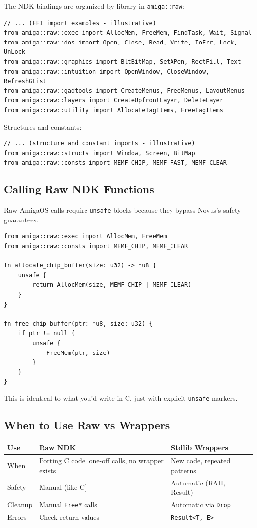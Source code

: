 The NDK bindings are organized by library in \texttt{amiga::raw}:

\begin{lstlisting}
// ... (FFI import examples - illustrative)
from amiga::raw::exec import AllocMem, FreeMem, FindTask, Wait, Signal
from amiga::raw::dos import Open, Close, Read, Write, IoErr, Lock, UnLock
from amiga::raw::graphics import BltBitMap, SetAPen, RectFill, Text
from amiga::raw::intuition import OpenWindow, CloseWindow, RefreshGList
from amiga::raw::gadtools import CreateMenus, FreeMenus, LayoutMenus
from amiga::raw::layers import CreateUpfrontLayer, DeleteLayer
from amiga::raw::utility import AllocateTagItems, FreeTagItems
\end{lstlisting}

Structures and constants:

\begin{lstlisting}
// ... (structure and constant imports - illustrative)
from amiga::raw::structs import Window, Screen, BitMap
from amiga::raw::consts import MEMF_CHIP, MEMF_FAST, MEMF_CLEAR
\end{lstlisting}

\subsection{Calling Raw NDK Functions}

Raw AmigaOS calls require \texttt{unsafe} blocks because they bypass Novus's safety guarantees:

\begin{lstlisting}
from amiga::raw::exec import AllocMem, FreeMem
from amiga::raw::consts import MEMF_CHIP, MEMF_CLEAR

fn allocate_chip_buffer(size: u32) -> *u8 {
    unsafe {
        return AllocMem(size, MEMF_CHIP | MEMF_CLEAR)
    }
}

fn free_chip_buffer(ptr: *u8, size: u32) {
    if ptr != null {
        unsafe {
            FreeMem(ptr, size)
        }
    }
}
\end{lstlisting}

This is identical to what you'd write in C, just with explicit \texttt{unsafe} markers.

\subsection{When to Use Raw vs Wrappers}

\begin{center}
\begin{tabular}{lp{5cm}p{5cm}}
\textbf{Use} & \textbf{Raw NDK} & \textbf{Stdlib Wrappers} \\
\hline
When & Porting C code, one-off calls, no wrapper exists & New code, repeated patterns \\
Safety & Manual (like C) & Automatic (RAII, Result) \\
Cleanup & Manual \texttt{Free*} calls & Automatic via \texttt{Drop} \\
Errors & Check return values & \texttt{Result<T, E>} \\
\end{tabular}
\end{center}

